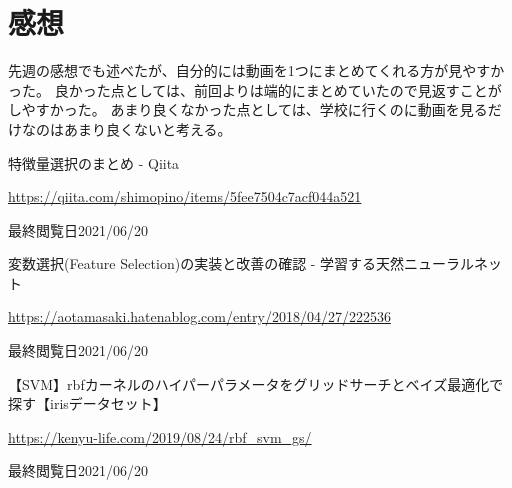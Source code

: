 \documentclass[12pt]{jarticle}
\begin{document}
\section{感想}
先週の感想でも述べたが、自分的には動画を1つにまとめてくれる方が見やすかった。
良かった点としては、前回よりは端的にまとめていたので見返すことがしやすかった。
あまり良くなかった点としては、学校に行くのに動画を見るだけなのはあまり良くないと考える。

\begin{thebibliography}{99}
    \label{sannkoubunnkenn_chapter}
    特徴量選択のまとめ - Qiita

    \url{https://qiita.com/shimopino/items/5fee7504c7acf044a521}

    最終閲覧日2021/06/20

    変数選択(Feature Selection)の実装と改善の確認 - 学習する天然ニューラルネット

    \url{https://aotamasaki.hatenablog.com/entry/2018/04/27/222536}

    最終閲覧日2021/06/20

    【SVM】rbfカーネルのハイパーパラメータをグリッドサーチとベイズ最適化で探す【irisデータセット】

    \url{https://kenyu-life.com/2019/08/24/rbf_svm_gs/}

    最終閲覧日2021/06/20
\end{thebibliography}

\clearpage
\appendix
\end{document}
